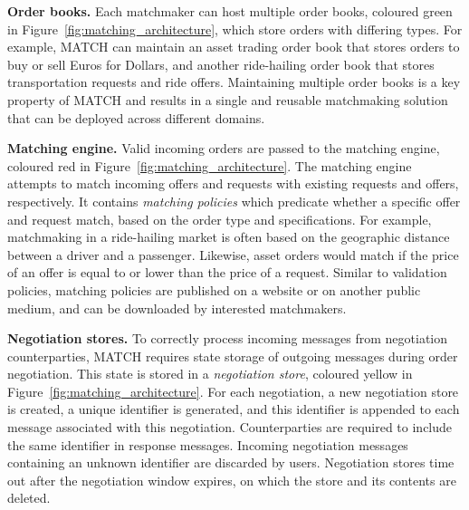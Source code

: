 
\textbf{Order books.}
Each matchmaker can host multiple order books, coloured green in Figure~\ref{fig:matching_architecture}, which store orders with differing types.
For example, MATCH can maintain an asset trading order book that stores orders to buy or sell Euros for Dollars, and another ride-hailing order book that stores transportation requests and ride offers.
Maintaining multiple order books is a key property of MATCH and results in a single and reusable matchmaking solution that can be deployed across different domains.

\textbf{Matching engine.}
Valid incoming orders are passed to the matching engine, coloured red in Figure~\ref{fig:matching_architecture}.
The matching engine attempts to match incoming offers and requests with existing requests and offers, respectively.
It contains \emph{matching policies} which predicate whether a specific offer and request match, based on the order type and specifications.
For example, matchmaking in a ride-hailing market is often based on the geographic distance between a driver and a passenger.
Likewise, asset orders would match if the price of an offer is equal to or lower than the price of a request.
Similar to validation policies, matching policies are published on a website or on another public medium, and can be downloaded by interested matchmakers.

\textbf{Negotiation stores.}
To correctly process incoming messages from negotiation counterparties, MATCH requires state storage of outgoing messages during order negotiation.
This state is stored in a \emph{negotiation store}, coloured yellow in Figure~\ref{fig:matching_architecture}.
For each negotiation, a new negotiation store is created, a unique identifier is generated, and this identifier is appended to each message associated with this negotiation.
Counterparties are required to include the same identifier in response messages.
Incoming negotiation messages containing an unknown identifier are discarded by users.
Negotiation stores time out after the negotiation window expires, on which the store and its contents are deleted.

